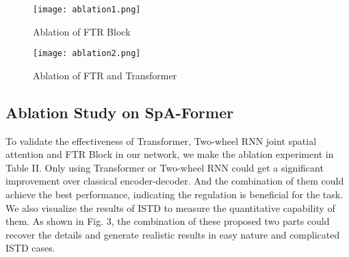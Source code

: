 \documentclass[journal]{IEEEtran}
\begin{document}
\begin{figure}
\centering
\texttt{[image: ablation1.png]}
\caption{Ablation of FTR Block}
\label{ablation1}
\end{figure}


\begin{figure}
\centering
\texttt{[image: ablation2.png]}
\caption{Ablation of FTR and Transformer}
\label{ablation3}
\end{figure}

\subsection{Ablation Study on SpA-Former}

To validate the effectiveness of Transformer, Two-wheel RNN joint spatial attention and FTR Block in our network, we make the ablation experiment in Table II. Only using Transformer or Two-wheel RNN could get a significant improvement over classical encoder-decoder. And the combination of them could achieve the best performance, indicating the
regulation is beneficial for the task. We also visualize the results of ISTD to measure the quantitative capability of them. As shown in Fig. 3, the combination of these proposed two parts could recover the details and generate realistic results in easy nature and complicated ISTD cases.


\begin{table*}[t]\caption{Performance comparison of shadow removal on ISTD}
\centering
{}
\label{comparetable}
\end{table*}
\end{document}
